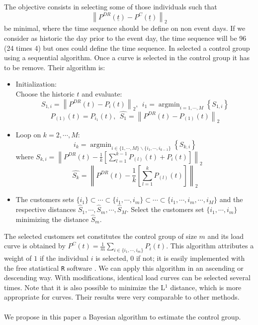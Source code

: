 \documentclass[journal]{IEEEtran}
\DeclareMathOperator*{\argmin}{argmin}
\begin{document}
The objective consists in selecting some of those individuals such that
\begin{equation}\label{generalpb}
\left\|P^{DR}(\underline{t}) - P^C(\underline{t})\right\|_2
\end{equation}
be minimal, where the time sequence should be define on non event days. If we consider
as historic the day prior to the event day, the time sequence will be 96 (24 times 4)
but ones could define the time sequence. In \cite{directestimation} selected a control
group using a sequential algorithm. Once a curve is selected in the control group it has
to be remove. Their  algorithm is:
\begin{itemize}\label{eq:algo}
\item Initialization: \\
Choose the historic $t$ and evaluate: 
$$S_{1,i}=\left\|P^{DR}(t) - P_i(t)\right\|_2, ~~i_1=\argmin_{i=1,\cdots,M} \left\{S_{1,i} \right\}$$
$$P_{(1)}(t)=P_{i_1}(t),~~\hat{S_1}=\left\|P^{DR}(t)-P_{(1)}(t)\right\|_2$$ 
\item Loop on $k=2, \cdots, M$:
$$i_k= \argmin_{i \in \{1,\cdots,M\}\backslash \{i_1,\cdots,i_{k-1}\}} \left\{S_{k,i} \right\}$$
where $S_{k,i}=\left\|P^{DR}(t) - \frac{1}{k}\left[\sum_{l=1}^{k-1} P_{(l)}(t)+P_i(t)\right]\right\|_2$
$$\hat{S_k}=\left\|P^{DR}(t)-\frac{1}{k}\left[\sum_{l=1}^{k} P_{(l)}(t)\right]\right\|_2$$
\item The customers sets $\{i_1\} \subset \cdots \subset \{i_1, \cdots, i_m\} \subset \cdots \subset \{i_1, \cdots, i_m, \cdots, i_M\}$ and the respective distances $\hat{S}_1, \cdots, \hat{S}_m, \cdots, \hat{S}_M$. Select the customers set $\{i_1, \cdots, i_m\}$ minimizing the distance $\hat{S}_m$.
\end{itemize}
The selected customers set constitutes the control group of size $m$ and 
its load curve is obtained by 
$P^C(t)= \frac{1}{m} \sum_{i \in \{i_1,\cdots,i_m\}} P_i(t)$. This 
algorithm attributes a weight of $1$ if the individual $i$ is selected, $0$ if not; it is 
easily implemented with the free statistical \texttt{R} software \cite{logiciel_R}. We 
can apply this algorithm in an ascending or descending way. With modifications, identical 
load curves can be selected several times. Note that it is also possible to 
minimize the L$^1$ distance, which is more appropriate for curves. Their results were
very comparable to other methods.\\
\\

We propose in this paper a Bayesian algorithm to estimate the control group.
\end{document}
